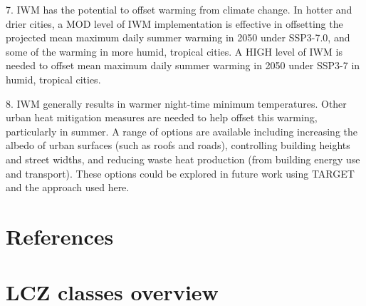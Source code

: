 \documentclass[final,3p,times,authoryear]{elsarticle}
\begin{document}
7. IWM has the potential to offset warming from climate change. In hotter and drier cities, a MOD level of IWM implementation is effective in offsetting the projected mean maximum daily summer warming in 2050 under SSP3-7.0, and some of the warming in more humid, tropical cities. A HIGH level of IWM is needed to offset mean maximum daily summer warming in 2050 under SSP3-7 in humid, tropical cities.

8. IWM generally results in warmer night-time minimum temperatures. Other urban heat mitigation measures are needed to help offset this warming, particularly in summer. A range of options are available including increasing the albedo of urban surfaces (such as roofs and roads), controlling building heights and street widths, and reducing waste heat production (from building energy use and transport). These options could be explored in future work using TARGET and the approach used here.

\section*{References}\label{sec:ref}
 


\appendix
\setcounter{table}{0}
\renewcommand{\thetable}{A\arabic{table}}

\section{LCZ classes overview}\label{sec:appendix1}
\end{document}
